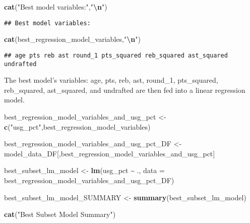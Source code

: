 \documentclass[
]{article}
\newenvironment{Shaded}{\begin{snugshade}}{\end{snugshade}}
\newcommand{\AttributeTok}[1]{\textcolor[rgb]{0.13,0.29,0.53}{#1}}
\newcommand{\FunctionTok}[1]{\textcolor[rgb]{0.13,0.29,0.53}{\textbf{#1}}}
\newcommand{\NormalTok}[1]{#1}
\newcommand{\OtherTok}[1]{\textcolor[rgb]{0.56,0.35,0.01}{#1}}
\newcommand{\SpecialCharTok}[1]{\textcolor[rgb]{0.81,0.36,0.00}{\textbf{#1}}}
\newcommand{\StringTok}[1]{\textcolor[rgb]{0.31,0.60,0.02}{#1}}
\begin{document}
\begin{Shaded}
\begin{Highlighting}[]
\FunctionTok{cat}\NormalTok{(}\StringTok{"Best model variables:"}\NormalTok{,}\StringTok{"}\SpecialCharTok{\textbackslash{}n}\StringTok{"}\NormalTok{)}
\end{Highlighting}
\end{Shaded}

\begin{verbatim}
## Best model variables:
\end{verbatim}

\begin{Shaded}
\begin{Highlighting}[]
\FunctionTok{cat}\NormalTok{(best\_regression\_model\_variables,}\StringTok{"}\SpecialCharTok{\textbackslash{}n}\StringTok{"}\NormalTok{)}
\end{Highlighting}
\end{Shaded}

\begin{verbatim}
## age pts reb ast round_1 pts_squared reb_squared ast_squared undrafted
\end{verbatim}

The best model's variables: age, pts, reb, ast, round\_1, pts\_squared,
reb\_squared, ast\_squared, and undrafted are then fed into a linear
regression model.

\begin{Shaded}
\begin{Highlighting}[]
\NormalTok{best\_regression\_model\_variables\_and\_usg\_pct }\OtherTok{\textless{}{-}}
  \FunctionTok{c}\NormalTok{(}\StringTok{"usg\_pct"}\NormalTok{,best\_regression\_model\_variables)}

\NormalTok{best\_regression\_model\_variables\_and\_usg\_pct\_DF }\OtherTok{\textless{}{-}}
\NormalTok{  model\_data\_DF[,best\_regression\_model\_variables\_and\_usg\_pct]}

\NormalTok{best\_subset\_lm\_model }\OtherTok{\textless{}{-}} \FunctionTok{lm}\NormalTok{(usg\_pct }\SpecialCharTok{\textasciitilde{}}\NormalTok{ .,}
  \AttributeTok{data =}\NormalTok{ best\_regression\_model\_variables\_and\_usg\_pct\_DF)}

\NormalTok{best\_subset\_lm\_model\_SUMMARY }\OtherTok{\textless{}{-}} \FunctionTok{summary}\NormalTok{(best\_subset\_lm\_model)}

\FunctionTok{cat}\NormalTok{(}\StringTok{"Best Subset Model Summary"}\NormalTok{)}
\end{Highlighting}
\end{Shaded}
\end{document}
